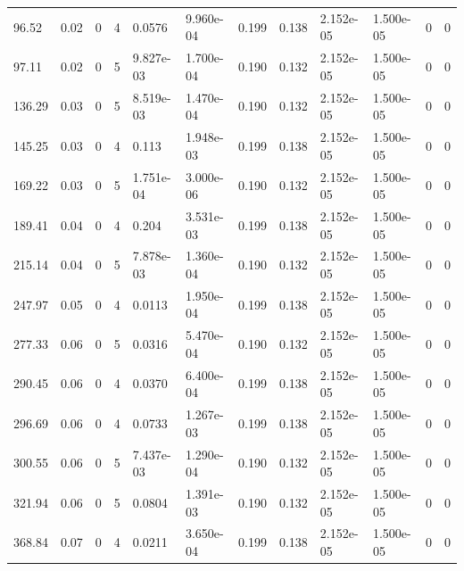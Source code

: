 \documentclass[preview]{standalone}
\begin{document}
{{\begin{tabular}{L{1.2cm}C{1.2cm} C{0.3cm}C{0.5cm} C{1.4cm}C{1.4cm} C{1.4cm}C{1.4cm} C{1.6cm}C{1.6cm} C{1.6cm}C{1.6cm}}
  96.52  &  0.02  & 0     &  4 &  0.0576  & 9.960e-04  &  0.199&   0.138& 2.152e-05 & 1.500e-05   &  0 & 0  \\ 
  97.11  &  0.02  & 0     &  5 &  9.827e-03  & 1.700e-04  &  0.190&   0.132& 2.152e-05 & 1.500e-05   &  0 & 0  \\ 
  136.29  &  0.03  & 0     &  5 &  8.519e-03  & 1.470e-04  &  0.190&   0.132& 2.152e-05 & 1.500e-05   &  0 & 0  \\ 
  145.25  &  0.03  & 0     &  4 &  0.113  & 1.948e-03  &  0.199&   0.138& 2.152e-05 & 1.500e-05   &  0 & 0  \\ 
  169.22  &  0.03  & 0     &  5 &  1.751e-04  & 3.000e-06  &  0.190&   0.132& 2.152e-05 & 1.500e-05   &  0 & 0  \\ 
  189.41  &  0.04  & 0     &  4 &  0.204  & 3.531e-03  &  0.199&   0.138& 2.152e-05 & 1.500e-05   &  0 & 0  \\ 
  215.14  &  0.04  & 0     &  5 &  7.878e-03  & 1.360e-04  &  0.190&   0.132& 2.152e-05 & 1.500e-05   &  0 & 0  \\ 
  247.97  &  0.05  & 0     &  4 &  0.0113  & 1.950e-04  &  0.199&   0.138& 2.152e-05 & 1.500e-05   &  0 & 0  \\ 
  277.33  &  0.06  & 0     &  5 &  0.0316  & 5.470e-04  &  0.190&   0.132& 2.152e-05 & 1.500e-05   &  0 & 0  \\ 
  290.45  &  0.06  & 0     &  4 &  0.0370  & 6.400e-04  &  0.199&   0.138& 2.152e-05 & 1.500e-05   &  0 & 0  \\ 
  296.69  &  0.06  & 0     &  4 &  0.0733  & 1.267e-03  &  0.199&   0.138& 2.152e-05 & 1.500e-05   &  0 & 0  \\ 
  300.55  &  0.06  & 0     &  5 &  7.437e-03  & 1.290e-04  &  0.190&   0.132& 2.152e-05 & 1.500e-05   &  0 & 0  \\ 
  321.94  &  0.06  & 0     &  5 &  0.0804  & 1.391e-03  &  0.190&   0.132& 2.152e-05 & 1.500e-05   &  0 & 0  \\ 
  368.84  &  0.07  & 0     &  4 &  0.0211  & 3.650e-04  &  0.199&   0.138& 2.152e-05 & 1.500e-05   &  0 & 0  \\ 
\hline 
\end{tabular} 

}}
\end{document}
